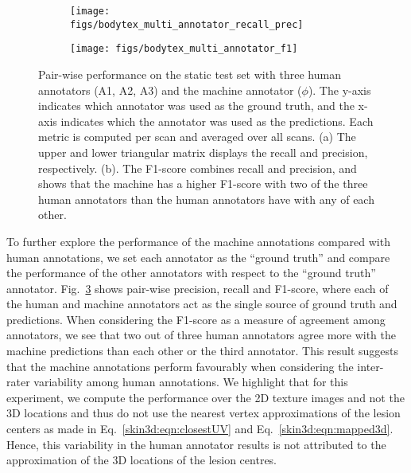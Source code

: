 \documentclass[journal]{IEEEtran}
\begin{document}
\begin{figure}[htb]
\centering
\begin{subfigure}[b]{0.49\linewidth}
\texttt{[image: figs/bodytex\_multi\_annotator\_recall\_prec]}
\caption{}
\label{skin3d:fig:bodytex-multi-annotator-recall-prec}
\end{subfigure}
\begin{subfigure}[b]{0.49\linewidth}
\texttt{[image: figs/bodytex\_multi\_annotator\_f1]}
\caption{}
\label{skin3d:fig:bodytex-multi-annotator-f1}
\end{subfigure}
\caption{Pair-wise performance on the static test set with three human annotators (A1, A2, A3) and the machine annotator ($\phi$). The y-axis indicates which annotator was used as the ground truth, and the x-axis indicates which the annotator was used as the predictions. Each metric is computed per scan and averaged over all scans. (a) The upper and lower triangular matrix displays the recall and precision, respectively. (b). The F1-score combines recall and precision, and shows that the machine has a higher F1-score with two of the three human annotators than the human annotators have with any of each other.}
\label{skin3d:fig:bodytex-multi-annotator-matrix}
\end{figure}

To further explore the performance of the machine annotations compared with human annotations, we set each annotator as the ``ground truth'' and compare the performance of the other annotators with respect to the ``ground truth'' annotator. Fig.~\ref{skin3d:fig:bodytex-multi-annotator-matrix} shows pair-wise precision, recall and F1-score, where each of the human and machine annotators act as the single source of ground truth and predictions. When considering the F1-score as a measure of agreement among annotators, we see that two out of three human annotators agree more with the machine predictions than each other or the third annotator. This result suggests that the machine annotations perform favourably when considering the inter-rater variability among human annotations. We highlight that for this experiment, we compute the performance over the 2D texture images and not the 3D locations and thus do not use the nearest vertex approximations of the lesion centers as made in Eq.~\ref{skin3d:eqn:closestUV} and Eq.~\ref{skin3d:eqn:mapped3d}. Hence, this variability in the human annotator results is not attributed to the approximation of the 3D locations of the lesion centres.
\end{document}
